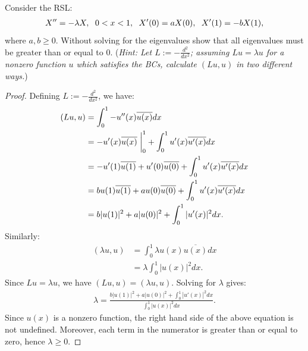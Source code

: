 \documentclass[10pt,oneside,openany]{memoir}
\begin{document}
\newpage
\begin{exercise}[manual-num={5}]
Consider the RSL:
    \begin{equation*}
    \begin{split}
        X'' = -\lambda X, \h6 0<x<1, \h6X'(0) = aX(0),\h6 X'(1) = -bX(1),
    \end{split}
    \end{equation*}
where $a,b \geq 0$. Without solving for the eigenvalues show that all eigenvalues must be greater than or equal to 0. (\textit{Hint: Let $L := -\frac{d^2}{dx^2}$; assuming $Lu = \lambda u$ for a nonzero function $u$ which satisfies the BCs, calculate $(Lu,u)$ in two different ways.})
\end{exercise}
    \begin{proof}
        Defining $L := -\frac{d^2}{dx^2}$, we have:
            \begin{equation*}
            \begin{split}
                (Lu,u)
                & = \int_0^1 -u''(x)\overline{u(x)}dx \\
                & = -u'(x)\overline{u(x)} \h3\bigg|_0^1 + \int_0^1 u'(x)\overline{u'(x)}dx \\
                & = -u'(1)\overline{u(1)}+u'(0)\overline{u(0)} + \int_0^1 u'(x)\overline{u'(x)}dx \\
                & = bu(1)\overline{u(1)} +au(0)\overline{u(0)} + \int_0^1 u'(x)\overline{u'(x)}dx \\ 
                & = b|u(1)|^2 + a|u(0)|^2 + \int_0^1 |u'(x)|^2 dx.
            \end{split}
            \end{equation*}
        Similarly:
            \begin{equation*}
            \begin{split}
                (\lambda u, u )
                & = \int_0^1 \lambda u(x) \overline{u(x)}dx \\
                & = \lambda \int_0^1 |u(x)|^2dx.
            \end{split}
            \end{equation*}
        Since $Lu = \lambda u$, we have $(Lu,u) = (\lambda u,u)$. Solving for $\lambda$ gives:
            \begin{equation*}
            \begin{split}
                \lambda = \frac{b|u(1)|^2 + a|u(0)|^2 + \int_0^1 |u'(x)|^2 dx}{\int_0^1 |u(x)|^2dx}.
            \end{split}
            \end{equation*}
        Since $u(x)$ is a nonzero function, the right hand side of the above equation is not undefined. Moreover, each term in the numerator is greater than or equal to zero, hence $\lambda \geq 0$.
    \end{proof}
\end{document}
